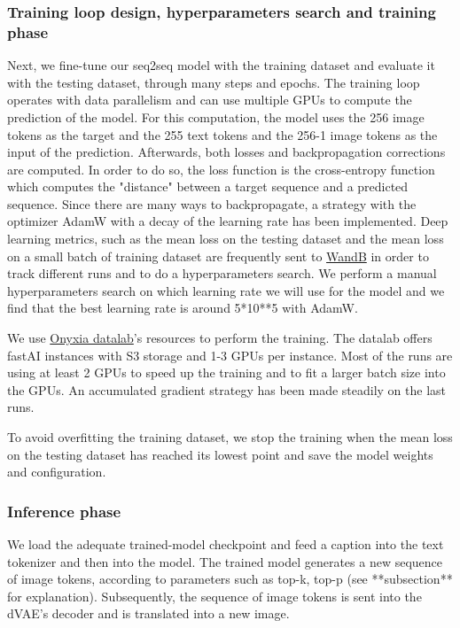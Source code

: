 \documentclass{article}
\begin{document}
\subsubsection{Training loop design, hyperparameters search and training phase}
Next, we fine-tune our seq2seq model with the training dataset and evaluate it with the testing dataset, through many steps and epochs. The training loop operates with data parallelism and can use multiple GPUs to compute the prediction of the model. For this computation, the model uses the 256 image tokens as the target and the 255 text tokens and the 256-1 image tokens as the input of the prediction.
Afterwards, both losses and backpropagation corrections are computed. In order to do so, the loss function is the cross-entropy function which computes the "distance" between a target sequence and a predicted sequence. Since there are many ways to backpropagate, a strategy with the optimizer AdamW with a decay of the learning rate has been implemented.
Deep learning metrics, such as the mean loss on the testing dataset and the mean loss on a small batch of training dataset are frequently sent to \href{https://wandb.ai/cthiounn/dalle-tiny}{WandB} in order to track different runs and to do a hyperparameters search.
We perform a manual hyperparameters search on which learning rate we will use for the model and we find that the best learning rate is around 5*10**5 with AdamW.

We use \href{https://datalab.sspcloud.fr/}{Onyxia datalab}'s resources to perform the training. The datalab offers fastAI instances with S3 storage and 1-3 GPUs per instance. Most of the runs are using at least 2 GPUs to speed up the training and to fit a larger batch size into the GPUs. An accumulated gradient strategy has been made steadily on the last runs.

To avoid overfitting the training dataset, we stop the training when the mean loss on the testing dataset has reached its lowest point and save the model weights and configuration.

\subsubsection{Inference phase}

We load the adequate trained-model checkpoint and feed a caption into the text tokenizer and then into the model. The trained model generates a new sequence of image tokens, according to parameters such as top-k, top-p (see **subsection** for explanation). Subsequently, the sequence of image tokens is sent into the dVAE's decoder and is translated into a new image.
\end{document}
